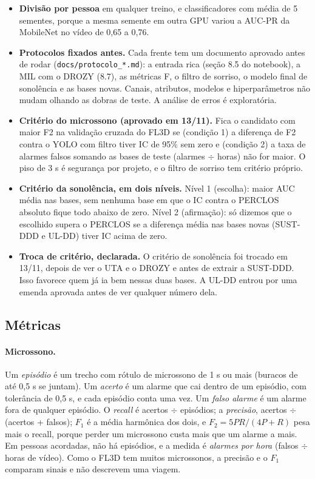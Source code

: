 \documentclass[11pt,a4paper]{article}
\begin{document}
\begin{itemize}
  \item \textbf{Divisão por pessoa} em qualquer treino, e classificadores com média de 5 sementes, porque a mesma semente em outra GPU variou a AUC-PR da MobileNet no vídeo de 0,65 a 0,76.
  \item \textbf{Protocolos fixados antes.} Cada frente tem um documento aprovado antes de rodar (\texttt{docs/protocolo\_*.md}): a entrada rica (seção 8.5 do notebook), a MIL com o DROZY (8.7), as métricas F, o filtro de sorriso, o modelo final de sonolência e as bases novas. Canais, atributos, modelos e hiperparâmetros não mudam olhando as dobras de teste. A análise de erros é exploratória.
  \item \textbf{Critério do microssono (aprovado em 13/11).} Fica o candidato com maior F2 na validação cruzada do FL3D se (condição 1) a diferença de F2 contra o YOLO com filtro tiver IC de 95\% sem zero e (condição 2) a taxa de alarmes falsos somando as bases de teste (alarmes $\div$ horas) não for maior. O piso de 3 s é segurança por projeto, e o filtro de sorriso tem critério próprio.
  \item \textbf{Critério da sonolência, em dois níveis.} Nível 1 (escolha): maior AUC média nas bases, sem nenhuma base em que o IC contra o PERCLOS absoluto fique todo abaixo de zero. Nível 2 (afirmação): só dizemos que o escolhido supera o PERCLOS se a diferença média nas bases novas (SUST-DDD e UL-DD) tiver IC acima de zero.
  \item \textbf{Troca de critério, declarada.} O critério de sonolência foi trocado em 13/11, depois de ver o UTA e o DROZY e antes de extrair a SUST-DDD. Isso favorece quem já ia bem nessas duas bases. A UL-DD entrou por uma emenda aprovada antes de ver qualquer número dela.
\end{itemize}

\subsection{Métricas}
\label{sec:metricas}

\paragraph{Microssono.} Um \emph{episódio} é um trecho com rótulo de microssono de 1 s ou mais (buracos de até 0,5 s se juntam). Um \emph{acerto} é um alarme que cai dentro de um episódio, com tolerância de 0,5 s, e cada episódio conta uma vez. Um \emph{falso alarme} é um alarme fora de qualquer episódio. O \emph{recall} é acertos $\div$ episódios; a \emph{precisão}, acertos $\div$ (acertos + falsos); $F_1$ é a média harmônica dos dois, e $F_2 = 5PR/(4P + R)$ pesa mais o recall, porque perder um microssono custa mais que um alarme a mais. Em pessoas acordadas, não há episódios, e a medida é \emph{alarmes por hora} (falsos $\div$ horas de vídeo). Como o FL3D tem muitos microssonos, a precisão e o $F_1$ comparam sinais e não descrevem uma viagem.
\end{document}

